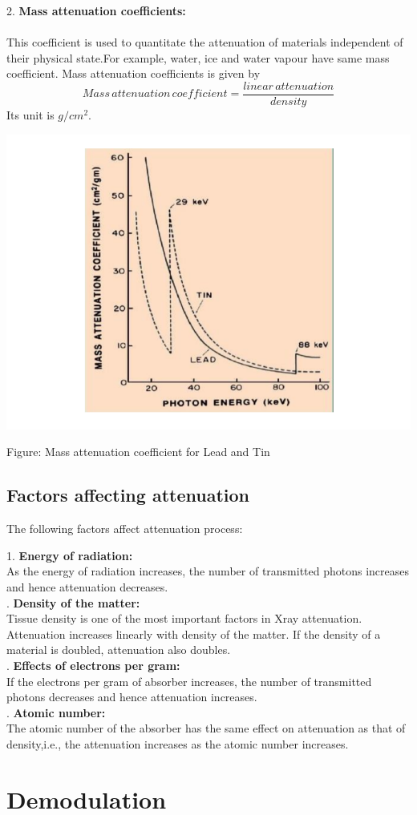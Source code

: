 \documentclass[12pt,a4paper]{article}%
\begin{document}
\begin{flushleft}
		2. \textbf{Mass attenuation coefficients:} 
		\paragraph{}
		This coefficient is used to quantitate the
		attenuation of materials independent of their
		physical state.For example, water, ice and water vapour have same mass coefficient. Mass attenuation coefficients is given by
		$$Mass \,attenuation\, coefficient=\frac{linear\, attenuation}{density} $$ 
		Its unit is $g/cm^2$.
		\begin{center}
			{\includegraphics[width=0.80 \textwidth]{./images/NKK2.png}}
		\end{center}
		\begin{center}
			Figure: Mass attenuation coefficient for Lead and Tin
		\end{center}
		\subsection{Factors affecting attenuation}  
		The following factors affect attenuation process:\\\bigskip
		
		1. \textbf{Energy of radiation:}\\\bigskip
		As the energy of radiation increases, the number of transmitted photons increases and hence attenuation decreases.\\. \textbf{Density of the matter:}\\\bigskip
		Tissue density is one of the most important factors in Xray
		attenuation. Attenuation increases linearly with density of the matter. If the density of a material is doubled, attenuation also doubles.\\. \textbf{Effects of electrons per gram:}\\\bigskip
		If the electrons per gram of absorber increases, the number of transmitted photons decreases and hence attenuation increases.\\. \textbf{Atomic number:}\\\bigskip
		The atomic number of the absorber has the same effect on attenuation as that of density,i.e., the attenuation increases as the atomic number increases.
		
	\end{flushleft}
	\pagebreak
	\section{Demodulation}
	\pagebreak
 	
\end{document}
